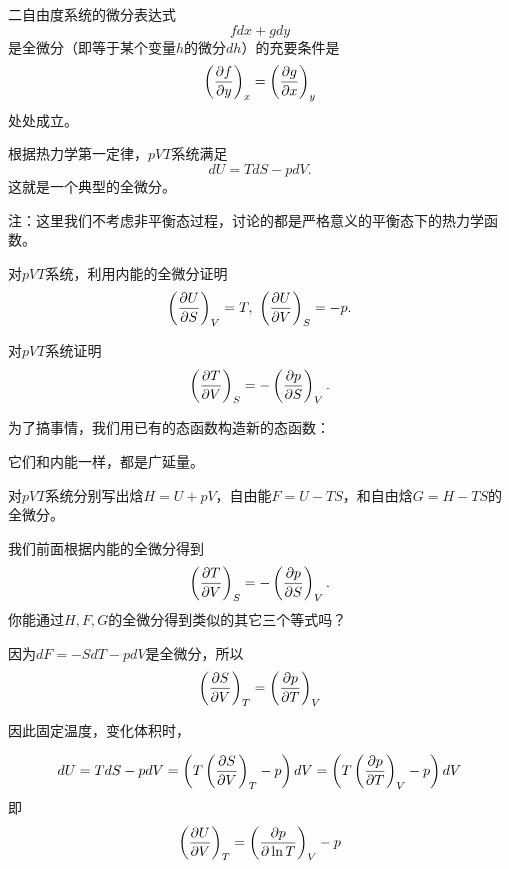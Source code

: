 \documentclass[CJK]{beamer}
\begin{document}
\begin{frame}
\bchL
二自由度系统的微分表达式
$$ f dx + g dy$$
是全微分（即等于某个变量$h$的微分$dh$）的充要条件是
$$\left(\frac{\partial f}{\partial y}\right)_{x} = \left(\frac{\partial g}{\partial x}\right)_{y}$$
处处成立。

\echL
\end{frame}

\begin{frame}
\bchL

根据热力学第一定律，$pVT$系统满足
{\blue $$ dU = TdS - pdV.$$}
这就是一个典型的全微分。

\skipline

{\small 注：这里我们不考虑非平衡态过程，讨论的都是严格意义的平衡态下的热力学函数。}
\echL
\end{frame}


\begin{frame}
\bchL
{}


对$pVT$系统，利用内能的全微分证明
$$\left(\frac{\partial U}{\partial S}\right)_{V} = T,\  \left(\frac{\partial U}{\partial V}\right)_{S} = -p. $$

\echL
\end{frame}

\begin{frame}
\bchL
{}

对$pVT$系统证明
$$\left(\frac{\partial T}{\partial V}\right)_{S} = - \left(\frac{\partial p}{\partial S}\right)_{V}. $$
\echL
\end{frame}


\begin{frame}
\bchL
为了搞事情，我们用已有的态函数构造新的态函数：




它们和内能一样，都是广延量。
\echL
\end{frame}

\begin{frame}
\bchL
{}

对$pVT$系统分别写出焓$H = U + pV$，自由能$F=U-TS$，和自由焓$G=H-TS$的全微分。

我们前面根据内能的全微分得到
$$\left(\frac{\partial T}{\partial V}\right)_{S} = - \left(\frac{\partial p}{\partial S}\right)_{V}. $$
你能通过$H,F,G$的全微分得到类似的其它三个等式吗？

\echL
\end{frame}



\begin{frame}
\bch

{\large 因为$d F = -SdT - pdV$是全微分，所以
{\blue
$$\left(\frac{\partial S}{\partial V}\right)_{T} = \left(\frac{\partial p}{\partial T}\right)_{V} $$
}


因此固定温度，变化体积时，}
$$ dU = TdS-pdV = \left(T\left(\frac{\partial S}{\partial V}\right)_{T} - p\right)dV = \left( T\left(\frac{\partial p}{\partial T}\right)_{V} - p\right) dV$$
{\large 即
{\blue
$$\left(\frac{\partial U}{\partial V}\right)_{T} = \left(\frac{\partial p}{\partial \ln T}\right)_{V} - p$$
}}
\ech
\end{frame}
\end{document}
